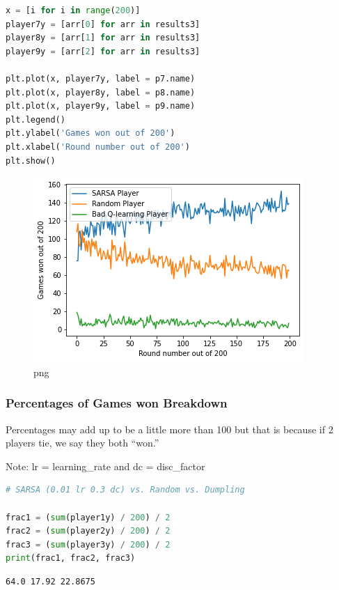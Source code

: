 \begin{lstlisting}[language=Python]
x = [i for i in range(200)]
player7y = [arr[0] for arr in results3]
player8y = [arr[1] for arr in results3]
player9y = [arr[2] for arr in results3]

plt.plot(x, player7y, label = p7.name)
plt.plot(x, player8y, label = p8.name)
plt.plot(x, player9y, label = p9.name)
plt.legend()
plt.ylabel('Games won out of 200')
plt.xlabel('Round number out of 200')
plt.show()
\end{lstlisting}

\begin{figure}
\centering
\includegraphics{sushigo_files/sushigo_16_0.png}
\caption{png}
\end{figure}

\hypertarget{percentages-of-games-won-breakdown}{%
\subsubsection{Percentages of Games won
Breakdown}\label{percentages-of-games-won-breakdown}}

Percentages may add up to be a little more than 100 but that is because
if 2 players tie, we say they both ``won.''

Note: lr = learning\_rate and dc = disc\_factor

\begin{lstlisting}[language=Python]
# SARSA (0.01 lr 0.3 dc) vs. Random vs. Dumpling

frac1 = (sum(player1y) / 200) / 2
frac2 = (sum(player2y) / 200) / 2
frac3 = (sum(player3y) / 200) / 2
print(frac1, frac2, frac3)
\end{lstlisting}

\begin{lstlisting}
64.0 17.92 22.8675
\end{lstlisting}

